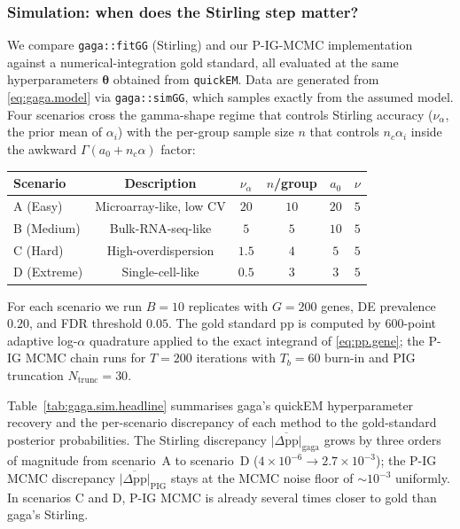 \subsubsection{Simulation: when does the Stirling step matter?}

We compare \texttt{gaga::fitGG} (Stirling) and our P-IG-MCMC
implementation against a numerical-integration gold standard, all
evaluated at the same hyperparameters $\boldsymbol\theta$ obtained from
\texttt{quickEM}. Data are generated from \eqref{eq:gaga.model} via
\texttt{gaga::simGG}, which samples exactly from the assumed model.
Four scenarios cross the gamma-shape regime that controls Stirling
accuracy ($\nu_\alpha$, the prior mean of $\alpha_i$) with the per-group
sample size $n$ that controls $n_c \alpha_i$ inside the awkward
$\Gamma(a_0 + n_c \alpha)$ factor:

\smallskip
\begin{center}\footnotesize
\renewcommand{\arraystretch}{1.05}
\begin{tabular}{@{}lccccc@{}}
\toprule
Scenario & Description & $\nu_\alpha$ & $n$/group & $a_0$ & $\nu$ \\
\midrule
A (Easy)    & Microarray-like, low CV  & $20$ & $10$ & $20$ & $5$ \\
B (Medium)  & Bulk-RNA-seq-like        & $5$  & $5$  & $10$ & $5$ \\
C (Hard)    & High-overdispersion      & $1.5$& $4$  & $5$  & $5$ \\
D (Extreme) & Single-cell-like         & $0.5$& $3$  & $3$  & $5$ \\
\bottomrule
\end{tabular}
\end{center}
\smallskip

For each scenario we run $B = 10$ replicates with $G = 200$ genes, DE
prevalence $0.20$, and FDR threshold $0.05$. The gold standard pp is
computed by 600-point adaptive log-$\alpha$ quadrature applied to the
exact integrand of \eqref{eq:pp.gene}; the P-IG MCMC chain runs for
$T = 200$ iterations with $T_b = 60$ burn-in and PIG truncation
$N_{\mathrm{trunc}} = 30$.

Table~\ref{tab:gaga.sim.headline} summarises gaga's quickEM
hyperparameter recovery and the per-scenario discrepancy of each method
to the gold-standard posterior probabilities. The Stirling discrepancy
$\overline{|\Delta\mathrm{pp}|}_{\text{gaga}}$ grows by three orders of
magnitude from scenario~A to scenario~D ($4{\times}10^{-6} \to
2.7{\times}10^{-3}$); the P-IG MCMC discrepancy
$\overline{|\Delta\mathrm{pp}|}_{\text{PIG}}$ stays at the MCMC noise
floor of $\sim\!10^{-3}$ uniformly. In scenarios C and D, P-IG MCMC is
already several times closer to gold than gaga's Stirling.

